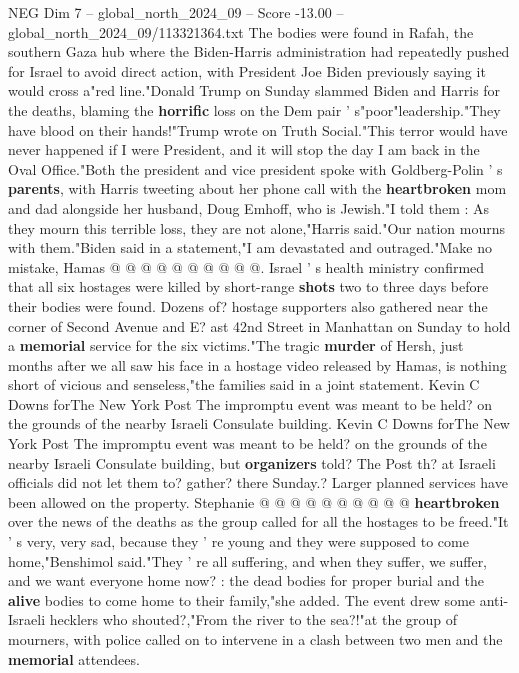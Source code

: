 \begin{textsample}{NEG Dim 7 – global\_north\_2024\_09 – Score -13.00 – global\_north\_2024\_09/113321364.txt}  \label{ex:f7_neg_007}
The bodies were found in Rafah, the southern Gaza hub where the Biden-Harris administration had repeatedly pushed for Israel to avoid direct action, with President Joe Biden previously saying it would cross a"red line."Donald Trump on Sunday slammed Biden and Harris for the deaths, blaming the \textbf{horrific} loss on the Dem pair ' s"poor"leadership."They have blood on their hands!"Trump wrote on Truth Social."This terror would have never happened if I were President, and it will stop the day I am back in the Oval Office."Both the president and vice president spoke with Goldberg-Polin ' s \textbf{parents}, with Harris tweeting about her phone call with the \textbf{heartbroken} mom and dad alongside her husband, Doug Emhoff, who is Jewish."I told them : As they mourn this terrible loss, they are not alone,"Harris said."Our nation mourns with them."Biden said in a statement,"I am devastated and outraged."Make no mistake, Hamas @ @ @ @ @ @ @ @ @ @.
Israel ' s health ministry confirmed that all six hostages were killed by short-range \textbf{shots} two to three days before their bodies were found.
Dozens of? hostage supporters also gathered near the corner of Second Avenue and E? ast 42nd Street in Manhattan on Sunday to hold a \textbf{memorial} service for the six victims."The tragic \textbf{murder} of Hersh, just months after we all saw his face in a hostage video released by Hamas, is nothing short of vicious and senseless,"the families said in a joint statement.
Kevin C Downs forThe New York Post The impromptu event was meant to be held? on the grounds of the nearby Israeli Consulate building.
Kevin C Downs forThe New York Post The impromptu event was meant to be held? on the grounds of the nearby Israeli Consulate building, but \textbf{organizers} told?
The Post th? at Israeli officials did not let them to? gather? there Sunday.?
Larger planned services have been allowed on the property.
Stephanie @ @ @ @ @ @ @ @ @ @ \textbf{heartbroken} over the news of the deaths as the group called for all the hostages to be freed."It ' s very, very sad, because they ' re young and they were supposed to come home,"Benshimol said."They ' re all suffering, and when they suffer, we suffer, and we want everyone home now? : the dead bodies for proper burial and the \textbf{alive} bodies to come home to their family,"she added.
The event drew some anti-Israeli hecklers who shouted?,"From the river to the sea?!"at the group of mourners, with police called on to intervene in a clash between two men and the \textbf{memorial} attendees.

\end{textsample}
